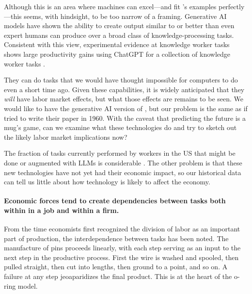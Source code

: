 \documentclass{article}
\begin{document}
Although this is an area where machines can excel---and fit \cite{bresnahan2020artificial}'s examples perfectly---this seems, with hindsight, to be too narrow of a framing.
Generative AI models have shown the ability to create output similar to or better than even expert humans can produce over a broad class of knowledge-processing tasks.  
Consistent with this view, experimental evidence at knowledge worker tasks shows large productivity gains using ChatGPT for a collection of knowledge worker tasks \citep{noy2023experimental}.

They can do tasks that we would have thought impossible for computers to do even a short time ago.
Given these capabilities, it is widely anticipated that they \emph{will} have labor market effects, but what those effects are remains to be seen. 
We would like to have the generative AI version of \cite{autor2003skill}, but our problem is the same as if \cite{autor2003skill} tried to write their paper in 1960.
With the caveat that predicting the future is a mug's game, can we examine what these technologies do and try to sketch out the likely labor market implications now? 

The fraction of tasks currently performed by workers in the US that might be done or augmented with LLMs is considerable \citep{eloundou2023gpts}.
The other problem is that these new technologies have not yet had their economic impact, so our historical data can tell us little about how technology is likely to affect the economy. 

\paragraph{Economic forces tend to create dependencies between tasks both within in a job and within a firm.}
From the time economists first recognized the division of labor as an important part of production, the interdependence between tasks has been noted.
The manufacture of pins proceeds linearly, with each step serving as an input to the next step in the productive process.
First the wire is washed and spooled, then pulled straight, then cut into lengths, then ground to a point, and so on.
A failure at any step jeoaparidizes the final product. 
This is at the heart of the \cite{kremer1993} o-ring model.
\end{document}
